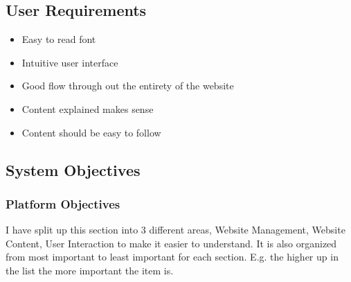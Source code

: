 \subsection{User Requirements}

\begin{itemize}
\item{Easy to read font}
\item{Intuitive user interface}
\item{Good flow through out the entirety of the website}
\item{Content explained makes sense}
\item{Content should be easy to follow}
\end{itemize}





\subsection{System Objectives}
\subsubsection{Platform Objectives}

I have split up this section into 3 different areas, Website Management, Website Content, User Interaction to make it easier to understand. It is also organized from most important to least important for each section. E.g. the higher up in the list the more important the item is. 

